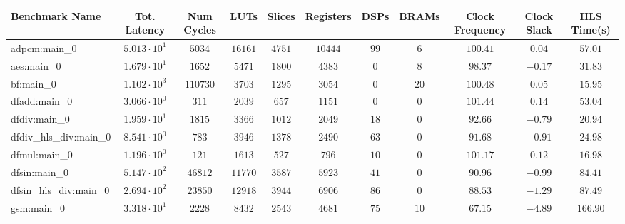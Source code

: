 \begin{tabular}{|l|c|c|c|c|c|c|c|c|c|c|}
\hline
Benchmark Name          & Tot. Latency           & Num Cycles & LUTs      & Slices    & Registers & DSPs    & BRAMs   & Clock Frequency & Clock Slack & HLS Time(s) \\
\hline
adpcm:main\_0           & $ 5.013 \cdot 10^{1} $ & $ 5034   $ & $ 16161 $ & $ 4751  $ & $ 10444 $ & $ 99  $ & $ 6   $ & $ 100.41      $ & $ 0.04    $ & $ 57.01   $ \\
aes:main\_0             & $ 1.679 \cdot 10^{1} $ & $ 1652   $ & $ 5471  $ & $ 1800  $ & $ 4383  $ & $ 0   $ & $ 8   $ & $ 98.37       $ & $ -0.17   $ & $ 31.83   $ \\
bf:main\_0              & $ 1.102 \cdot 10^{3} $ & $ 110730 $ & $ 3703  $ & $ 1295  $ & $ 3054  $ & $ 0   $ & $ 20  $ & $ 100.48      $ & $ 0.05    $ & $ 15.95   $ \\
dfadd:main\_0           & $ 3.066 \cdot 10^{0} $ & $ 311    $ & $ 2039  $ & $ 657   $ & $ 1151  $ & $ 0   $ & $ 0   $ & $ 101.44      $ & $ 0.14    $ & $ 53.04   $ \\
dfdiv:main\_0           & $ 1.959 \cdot 10^{1} $ & $ 1815   $ & $ 3366  $ & $ 1012  $ & $ 2049  $ & $ 18  $ & $ 0   $ & $ 92.66       $ & $ -0.79   $ & $ 20.94   $ \\
dfdiv\_hls\_div:main\_0 & $ 8.541 \cdot 10^{0} $ & $ 783    $ & $ 3946  $ & $ 1378  $ & $ 2490  $ & $ 63  $ & $ 0   $ & $ 91.68       $ & $ -0.91   $ & $ 24.98   $ \\
dfmul:main\_0           & $ 1.196 \cdot 10^{0} $ & $ 121    $ & $ 1613  $ & $ 527   $ & $ 796   $ & $ 10  $ & $ 0   $ & $ 101.17      $ & $ 0.12    $ & $ 16.98   $ \\
dfsin:main\_0           & $ 5.147 \cdot 10^{2} $ & $ 46812  $ & $ 11770 $ & $ 3587  $ & $ 5923  $ & $ 41  $ & $ 0   $ & $ 90.96       $ & $ -0.99   $ & $ 84.41   $ \\
dfsin\_hls\_div:main\_0 & $ 2.694 \cdot 10^{2} $ & $ 23850  $ & $ 12918 $ & $ 3944  $ & $ 6906  $ & $ 86  $ & $ 0   $ & $ 88.53       $ & $ -1.29   $ & $ 87.49   $ \\
gsm:main\_0             & $ 3.318 \cdot 10^{1} $ & $ 2228   $ & $ 8432  $ & $ 2543  $ & $ 4681  $ & $ 75  $ & $ 10  $ & $ 67.15       $ & $ -4.89   $ & $ 166.90  $ \\

\end{tabular}
